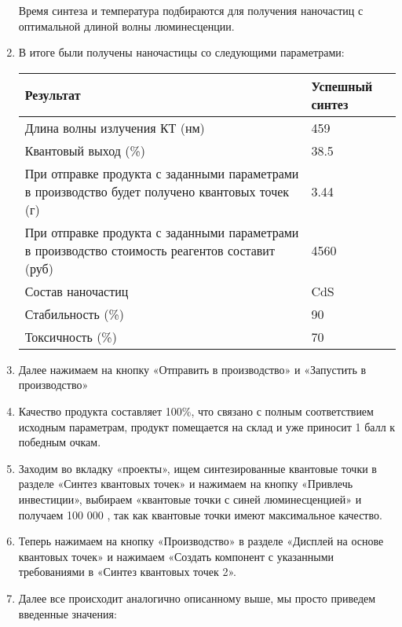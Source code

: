 \begin{enumerate}
    Время синтеза и температура подбираются для получения наночастиц с оптимальной длиной волны люминесценции.

    \item В итоге были получены наночастицы со следующими параметрами:
    
    \begin{table}[H]
        \begin{center}
            \begin{tabular}{|p{9cm}|p{4cm}|}
                \hline
                Результат & Успешный синтез \\
                \hline
                Длина волны излучения КТ (нм) & 459 \\
                \hline
                Квантовый выход (\%) & 38.5 \\
                \hline
                При отправке продукта с заданными  параметрами в производство будет  получено квантовых точек (г)&	3.44 \\
                \hline
                При отправке продукта с заданными  параметрами в производство стоимость реагентов составит (руб)&	4560 \\
                \hline
                Состав наночастиц	&CdS \\
                \hline
                Стабильность (\%)&	90 \\
                \hline
                Токсичность (\%)&	70 \\
                \hline
            \end{tabular}
        \end{center}
    \end{table}

    \item Далее нажимаем на кнопку «Отправить в производство» и «Запустить в производство»
    \item Качество продукта составляет 100\%, что связано с полным соответствием исходным параметрам, продукт помещается на склад и уже приносит 1 балл к победным очкам.
    \item Заходим во вкладку «проекты», ищем синтезированные квантовые точки в разделе «Синтез квантовых точек» и нажимаем на кнопку «Привлечь инвестиции», выбираем «квантовые точки с синей люминесценцией» и получаем 100 000 \textpeso, так как квантовые точки имеют максимальное качество.
    \item Теперь нажимаем на кнопку «Производство» в разделе «Дисплей на основе квантовых точек» и нажимаем «Создать компонент с указанными требованиями в «Синтез квантовых точек 2».
    \item Далее все происходит аналогично описанному выше, мы просто приведем введенные значения:
    

\end{enumerate}

